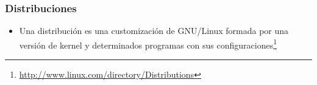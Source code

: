 \begin{frame}
	\frametitle{Distribuciones}
	\begin{itemize}
		\item Una distribución es una customización de GNU/Linux formada por una versión de kernel y determinados programas con sus configuraciones\footnote{\url{http://www.linux.com/directory/Distributions}}
	\end{itemize}
	\begin{figure}[h]       
	    \hspace{30px}
	    \hspace{30px}
	\end{figure}
\end{frame}

